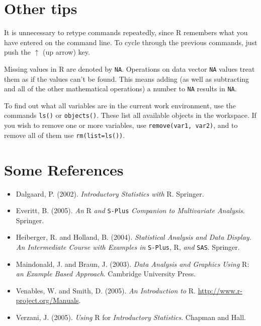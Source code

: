 \documentclass[english]{article}
\begin{document}
\section{Other tips}

It is unnecessary to retype commands repeatedly, since \textsf{R}
remembers what you have entered on the command line. To cycle through
the previous commands, just push the $\uparrow$ (up arrow) key. 

Missing values in \textsf{R} are denoted by \texttt{NA}. Operations
on data vector \texttt{NA} values treat them as if the values can't
be found. This means adding (as well as subtracting and all of the
other mathematical operations) a number to \texttt{NA} results in
\texttt{NA}.

To find out what all variables are in the current work environment,
use the commands \texttt{ls()} or \texttt{objects()}. These list all
available objects in the workspace. If you wish to remove one or more
variables, use \texttt{remove(var1, var2)}, and to remove all of them
use \texttt{rm(list=ls())}. 


\section{Some References}
\begin{itemize}
\item Dalgaard, P. (2002). \emph{Introductory Statistics with} \textsf{R}.
Springer.
\item Everitt, B. (2005). \emph{An} \textsf{R} \emph{and} \texttt{S-Plus}
\emph{Companion to Multivariate Analysis}. Springer.
\item Heiberger, R. and Holland, B. (2004). \emph{Statistical Analysis and
Data Display. An Intermediate Course with Examples in} \texttt{S-Plus},
\textsf{R}, \emph{and} \texttt{SAS}. Springer.
\item Maindonald, J. and Braun, J. (2003). \emph{Data Analysis and Graphics
Using} \textsf{R}: \emph{an Example Based Approach}. Cambridge University
Press.
\item Venables, W. and Smith, D. (2005). \emph{An Introduction to} \textsf{R}.
\url{http://www.r-project.org/Manuals}.
\item Verzani, J. (2005). \emph{Using} \textsf{R} for \emph{Introductory
Statistics}. Chapman and Hall.\end{itemize}
\end{document}
